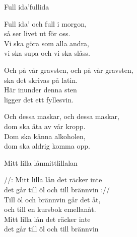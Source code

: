 \begin{song}{Full ida'}{fullida}
\begin{vers}
Full ida' och full i morgon,\\
så ser livet ut för oss.\\
Vi ska göra som alla andra,\\
vi ska supa och vi ska slåss.\\
\end{vers}
\begin{vers}
Och på vår gravsten, och på vår gravsten,\\
ska det skrivas på latin.\\
Här inunder denna sten\\
ligger det ett fyllesvin.\\
\end{vers}
\begin{vers}
Och dessa maskar, och dessa maskar,\\
dom ska äta av vår kropp.\\
Dom ska känna alkoholen,\\
dom ska aldrig komma opp.\\
\end{vers}
\end{song}

\begin{song}{Mitt lilla lån}{mittlillalan}
\begin{vers}
//: Mitt lilla lån det räcker inte\\
det går till öl och till brännvin ://\\
Till öl och brännvin går det åt,\\
och till en kursbok emellanåt.\\
Mitt lilla lån det räcker inte\\
det går till öl och till brännvin\\
\end{vers}
\end{song}

\newpage

